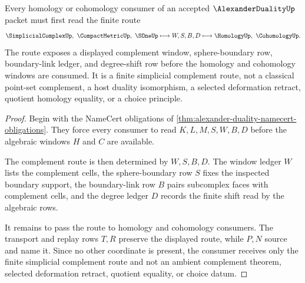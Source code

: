 \begin{theorem}
\label{thm:alexander-duality-simplicial-complement-route}
Every homology or cohomology consumer of an accepted $\AlexanderDualityUp$ packet must first read the finite route
$$
\SimplicialComplexUp,\ \CompactMetricUp,\ \SOneUp
\longmapsto
W,S,B,D
\longmapsto
\HomologyUp,\ \CohomologyUp .
$$
The route exposes a displayed complement window, sphere-boundary row, boundary-link ledger, and degree-shift row before the homology and cohomology windows are consumed. It is a finite simplicial complement route, not a classical point-set complement, a host duality isomorphism, a selected deformation retract, quotient homology equality, or a choice principle.
\end{theorem}
\begin{proof}
Begin with the NameCert obligations of \autoref{thm:alexander-duality-namecert-obligations}. They force every consumer to read $K,L,M,S,W,B,D$ before the algebraic windows $H$ and $C$ are available.

The complement route is then determined by $W,S,B,D$. The window ledger $W$ lists the complement cells, the sphere-boundary row $S$ fixes the inspected boundary support, the boundary-link row $B$ pairs subcomplex faces with complement cells, and the degree ledger $D$ records the finite shift read by the algebraic rows.

It remains to pass the route to homology and cohomology consumers. The transport and replay rows $T,R$ preserve the displayed route, while $P,N$ source and name it. Since no other coordinate is present, the consumer receives only the finite simplicial complement route and not an ambient complement theorem, selected deformation retract, quotient equality, or choice datum.
\end{proof}



